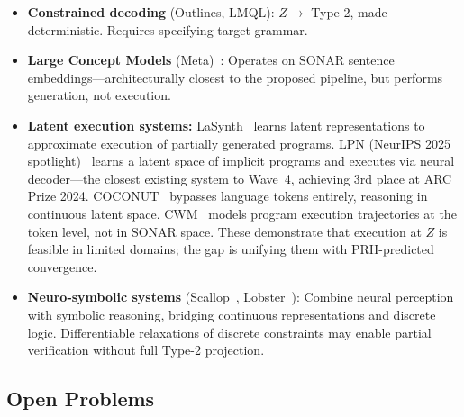 \documentclass[11pt]{article}
\theoremstyle{definition}
\begin{document}
\begin{itemize}[nosep]
  \item \textbf{Constrained decoding} (Outlines, LMQL): $Z \to$ Type-2, made deterministic. Requires specifying target grammar.
  \item \textbf{Large Concept Models} (Meta)~\cite{meta2024lcm}: Operates on SONAR sentence embeddings---architecturally closest to the proposed pipeline, but performs generation, not execution.
  \item \textbf{Latent execution systems:} LaSynth~\cite{chen2021lasynth} learns latent representations to approximate execution of partially generated programs. LPN (NeurIPS 2025 spotlight)~\cite{macfarlane2025lpn} learns a latent space of implicit programs and executes via neural decoder---the closest existing system to Wave~4, achieving 3rd place at ARC Prize 2024. COCONUT~\cite{hao2024coconut} bypasses language tokens entirely, reasoning in continuous latent space. CWM~\cite{metafair2025cwm} models program execution trajectories at the token level, not in SONAR space. These demonstrate that execution at $Z$ is feasible in limited domains; the gap is unifying them with PRH-predicted convergence.
  \item \textbf{Neuro-symbolic systems} (Scallop~\cite{li2023scallop}, Lobster~\cite{huang2026lobster}): Combine neural perception with symbolic reasoning, bridging continuous representations and discrete logic. Differentiable relaxations of discrete constraints may enable partial verification without full Type-2 projection.
\end{itemize}

\subsection{Open Problems}
\end{document}
